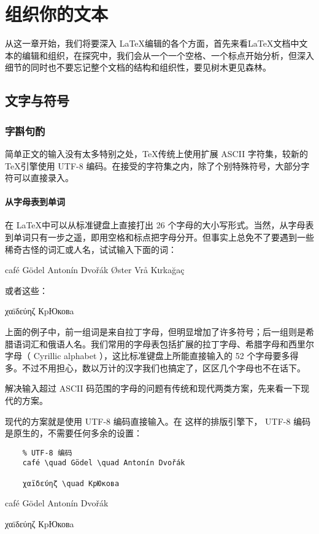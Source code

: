 \chapter{组织你的文本}

从这一章开始，我们将要深入 \LaTeX 编辑的各个方面，首先来看\LaTeX 文档中文本的编辑和组织，在探究中，我们会从一个一个空格、一个标点开始分析，但深入细节的同时也不要忘记整个文档的结构和组织性，要见树木更见森林。

\section{文字与符号}

\subsection{字斟句酌}

简单正文的输入没有太多特别之处，\TeX 传统上使用扩展 ASCII 字符集，较新的\TeX 引擎使用 UTF-8 编码。在接受的字符集之内，除了个别特殊符号，大部分字符可以直接录入。

\subsubsection{从字母表到单词}

在 \LaTeX 中可以从标准键盘上直接打出 26 个字母的大小写形式。当然，从字母表到单词只有一步之遥，即用空格和标点把字母分开。但事实上总免不了要遇到一些稀奇古怪的词汇或人名，试试输入下面的词：
\begin{center}
    café \quad Gödel \quad Antonín Dvořák \quad Øster Vrå \quad Kιrkağaç
\end{center}

或者这些：
\begin{center}
    χαïδεύηζ \quad КpЮковa
\end{center}

上面的例子中，前一组词是来自拉丁字母，但明显增加了许多符号；后一组则是希腊语词汇和俄语人名。我们常用的字母表包括扩展的拉丁字母、希腊字母和西里尔字母（ Cyrillic alphabet ），这比标准键盘上所能直接输入的 52 个字母要多得多。不过不用担心，数以万计的汉字我们也搞定了，区区几个字母也不在话下。

解决输入超过 ASCII 码范围的字母的问题有传统和现代两类方案，先来看一下现代的方案。

现代的方案就是使用 UTF-8 编码直接输入。在 \XeTeX 这样的排版引擎下， UTF-8 编码是原生的，不需要任何多余的设置：

\begin{minipage}[t]{0.45\textwidth}
    \begin{lstlisting}
    % UTF-8 编码
    café \quad Gödel \quad Antonín Dvořák

    χαïδεύηζ \quad КpЮковa
    \end{lstlisting}
\end{minipage}
\hfill
\begin{minipage}[t]{0.45\textwidth}
    \vspace{0.1cm}
    \hspace{0.5cm}

    café \quad Gödel \quad Antonín Dvořák

    χαïδεύηζ \quad КpЮковa
\end{minipage}

